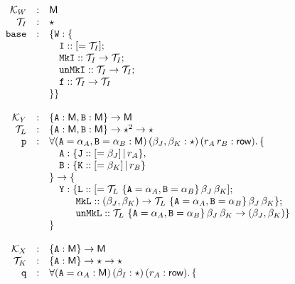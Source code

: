 \documentclass{article}
\begin{document}
\begin{figure}[H]
\[
\begin{array}{rcl}
\mathcal{K}_W &:& \mathsf{M} \\
\mathcal{T}_I &:& \star \\
\mbox{\texttt{base}} &:& \{ \mathtt{W} : \{ \\
&&\quad \mathtt{I} :: [= \mathcal{T}_I]; \\
&&\quad \mathtt{MkI} :: \mathcal{T}_I \rightarrow \mathcal{T}_I; \\
&&\quad \mathtt{unMkI} :: \mathcal{T}_I \rightarrow \mathcal{T}_I; \\
&&\quad \mathtt{f} :: \mathcal{T}_I \rightarrow \mathcal{T}_I \\
&&\} \} \\
\\
\mathcal{K}_Y &:& \{ \mathtt{A} : \mathsf{M}, \mathtt{B} : \mathsf{M} \} \rightarrow \mathsf{M} \\
\mathcal{T}_L &:& \{ \mathtt{A} : \mathsf{M}, \mathtt{B} : \mathsf{M} \} \rightarrow \star^2 \rightarrow \star \\
\mbox{\texttt{p}} &:& \forall (\mathtt{A} = \alpha_A, \mathtt{B} = \alpha_B : \mathsf{M})\, (\beta_J, \beta_K : \star)\, (r_A\, r_B : \textsf{row}). \, \{ \\
&& \quad\mathtt{A} : \{ \mathtt{J} :: [= \beta_J] \,|\, r_A \}, \\
&& \quad\mathtt{B} : \{ \mathtt{K} :: [= \beta_K] \,|\, r_B \} \\
&& \} \rightarrow \{ \\
&& \quad\mathtt{Y} : \{ \mathtt{L} :: [= \mathcal{T}_L~ \{\mathtt{A} = \alpha_A, \mathtt{B} = \alpha_B\}\, \beta_J\, \beta_K]; \\
&& \quad\quad~~\texttt{MkL} :: (\beta_J, \beta_K) \rightarrow \mathcal{T}_L~ \{\mathtt{A} = \alpha_A, \mathtt{B} = \alpha_B\}\, \beta_J\, \beta_K  \}; \\
&& \quad\quad~~\texttt{unMkL} :: \mathcal{T}_L~\{\mathtt{A} = \alpha_A, \mathtt{B} = \alpha_B\}\, \beta_J\, \beta_K  \rightarrow (\beta_J, \beta_K)   \} \\
&& \} \\
\\
\mathcal{K}_X &:& \{ \mathtt{A} : \mathsf{M} \} \rightarrow \mathsf{M} \\
\mathcal{T}_K &:& \{ \mathtt{A} : \mathsf{M} \} \rightarrow \star \rightarrow \star \\
\mbox{\texttt{q}} &:& \forall (\mathtt{A} = \alpha_A : \mathsf{M})\, (\beta_I : \star)\, (r_A : \textsf{row}). \, \{ \\

\end{array}\]
\end{figure}
\end{document}
